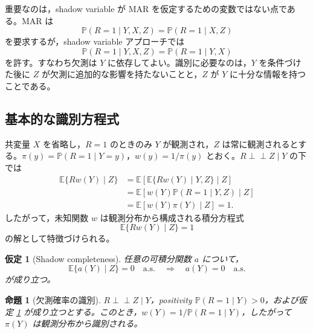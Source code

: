 \documentclass[dvipdfmx,autodetect-engine]{jsarticle}
\newtheorem{assumption}{仮定}
\newtheorem{proposition}{命題}
\newcommand{\indep}{\mathrel{\perp\!\!\!\perp}}
\newcommand{\E}{\mathbb{E}}
\newcommand{\Prb}{\mathbb{P}}
\newcommand{\1}{\mathbf{1}}
\begin{document}
重要なのは，shadow variable が MAR を仮定するための変数ではない点である。MAR は
\begin{equation}
  \Prb(R=1\mid Y,X,Z)=\Prb(R=1\mid X,Z)
\end{equation}
を要求するが，shadow variable アプローチでは
\begin{equation}
  \Prb(R=1\mid Y,X,Z)=\Prb(R=1\mid Y,X)
\end{equation}
を許す。すなわち欠測は $Y$ に依存してよい。識別に必要なのは，$Y$ を条件づけた後に $Z$ が欠測に追加的な影響を持たないことと，$Z$ が $Y$ に十分な情報を持つことである。

\subsection{基本的な識別方程式}

共変量 $X$ を省略し，$R=1$ のときのみ $Y$ が観測され，$Z$ は常に観測されるとする。$\pi(y)=\Prb(R=1\mid Y=y)$，$w(y)=1/\pi(y)$ とおく。$R\indep Z\mid Y$ の下では
\begin{align}
  \E\{Rw(Y)\mid Z\}
  &=\E\left[\E\{Rw(Y)\mid Y,Z\}\mid Z\right] \\
  &=\E\left[w(Y)\Prb(R=1\mid Y,Z)\mid Z\right] \\
  &=\E\left[w(Y)\pi(Y)\mid Z\right]=1.
  \label{eq:shadow-moment-basic}
\end{align}
したがって，未知関数 $w$ は観測分布から構成される積分方程式
\begin{equation}
  \E\{Rw(Y)\mid Z\}=1
  \label{eq:shadow-integral-equation}
\end{equation}
の解として特徴づけられる。

\begin{assumption}[Shadow completeness]
\label{ass:shadow-completeness-review}
任意の可積分関数 $a$ について，
\begin{equation}
  \E\{a(Y)\mid Z\}=0\quad \mathrm{a.s.}
  \quad\Longrightarrow\quad
  a(Y)=0\quad \mathrm{a.s.}
  \label{eq:shadow-completeness-review}
\end{equation}
が成り立つ。
\end{assumption}

\begin{proposition}[欠測確率の識別]
\label{prop:shadow-propensity-id}
$R\indep Z\mid Y$，positivity $\Prb(R=1\mid Y)>0$，および仮定 \ref{ass:shadow-completeness-review} が成り立つとする。このとき，$w(Y)=1/\Prb(R=1\mid Y)$，したがって $\pi(Y)$ は観測分布から識別される。
\end{proposition}
\end{document}

